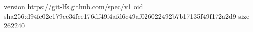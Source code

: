 version https://git-lfs.github.com/spec/v1
oid sha256:d94fc02e179cc34fce176df49f4afd6c49af026022492b7b17135f49f172a2d9
size 262240
